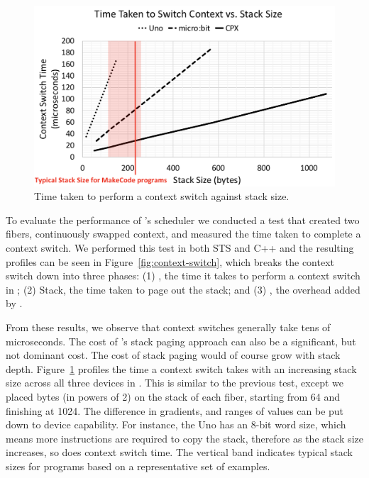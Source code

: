 \begin{figure}[ht]
    \includegraphics[width=\columnwidth]{images/context-vs-stack.png}
\caption{\label{fig:context-vs-stack}Time taken to perform a context switch against stack size.}
\end{figure}

To evaluate the performance of \CON's scheduler we conducted a test that created two fibers, continuously swapped context, and measured the time taken to complete a context switch.
We performed this test in both STS and C++ and the resulting profiles can be seen in Figure~\ref{fig:context-switch}, which
breaks the context switch down into three phases:
(1) \CON, the time it takes to perform a context switch in \CON;
(2) Stack, the time taken to page out the \MC stack; and
(3) \MCN, the overhead added by \MCN.

From these results, we observe that context switches generally take tens of microseconds. The cost of \CON's stack paging approach can also be a significant, but not dominant cost. The cost of stack paging would of course grow with stack depth. Figure~\ref{fig:context-vs-stack} profiles the time a context switch takes with an increasing stack size across all three devices in \CON. This is similar to the previous test, except we placed bytes (in powers of 2) on the stack of each fiber, starting from 64 and finishing at 1024. The difference in gradients, and ranges of values can be put down to device capability. For instance, the Uno has an 8-bit word size, which means more instructions are required to copy the stack, therefore as the stack size increases, so does context switch time. The vertical band indicates typical stack sizes for \MC programs based on a representative set of examples.


